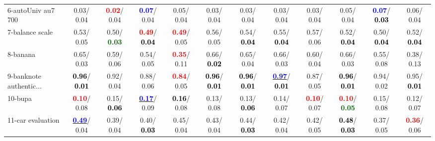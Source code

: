 \begin{table}[h]
\begin{center}
{\begin{tabular}{lc|c|c|c|c|c|c|c|c|c|c}
6-autoUniv au7 700 &   0.03/  0.04 & \textcolor{red}{\textbf{  0.02}}/  0.04 & \textcolor{blue}{\textbf{  0.07}}/  0.04 &   0.05/  0.04 &   0.03/  0.04 &   0.03/  0.04 &   0.03/  0.04 &   0.03/  0.04 &   0.05/  0.04 & \textcolor{blue}{\textbf{  0.07}}/\textcolor{black}{\textbf{  0.03}} &   0.06/  0.04 \\
7-balance scale &   0.53/  0.05 &   0.50/\textcolor{darkgreen}{\textbf{  0.03}} & \textcolor{red}{\textbf{  0.49}}/\textcolor{black}{\textbf{  0.04}} & \textcolor{red}{\textbf{  0.49}}/  0.05 &   0.56/  0.05 &   0.54/\textcolor{black}{\textbf{  0.04}} &   0.55/\textcolor{black}{\textbf{  0.04}} &   0.57/  0.06 &   0.52/\textcolor{black}{\textbf{  0.04}} &   0.50/\textcolor{black}{\textbf{  0.04}} &   0.52/\textcolor{black}{\textbf{  0.04}} \\ \hline
8-banana &   0.65/  0.03 &   0.59/  0.06 &   0.54/  0.05 & \textcolor{red}{\textbf{  0.35}}/  0.11 &   0.66/\textcolor{black}{\textbf{  0.02}} &   0.65/  0.04 &   0.66/  0.03 &   0.60/  0.04 &   0.66/  0.03 &   0.55/  0.08 &   0.38/  0.13 \\
9-banknote authentic... & \textcolor{black}{\textbf{  0.96}}/\textcolor{black}{\textbf{  0.01}} &   0.92/  0.04 &   0.88/  0.06 & \textcolor{red}{\textbf{  0.84}}/  0.05 & \textcolor{black}{\textbf{  0.96}}/\textcolor{black}{\textbf{  0.01}} & \textcolor{black}{\textbf{  0.96}}/\textcolor{black}{\textbf{  0.01}} & \underline{\textcolor{blue}{\textbf{  0.97}}}/\textcolor{black}{\textbf{  0.01}} &   0.87/  0.05 & \textcolor{black}{\textbf{  0.96}}/\textcolor{black}{\textbf{  0.01}} &   0.94/  0.02 &   0.95/\textcolor{black}{\textbf{  0.01}} \\
10-bupa & \textcolor{red}{\textbf{  0.10}}/  0.08 &   0.15/\textcolor{black}{\textbf{  0.06}} & \underline{\textcolor{blue}{\textbf{  0.17}}}/  0.09 & \textcolor{black}{\textbf{  0.16}}/  0.08 &   0.13/  0.08 &   0.13/\textcolor{black}{\textbf{  0.06}} &   0.14/  0.07 & \textcolor{red}{\textbf{  0.10}}/  0.07 & \textcolor{red}{\textbf{  0.10}}/\textcolor{darkgreen}{\textbf{  0.05}} &   0.15/  0.08 &   0.12/  0.07 \\
11-car evaluation & \underline{\textcolor{blue}{\textbf{  0.49}}}/  0.04 &   0.39/  0.04 &   0.40/\textcolor{black}{\textbf{  0.03}} &   0.45/  0.04 &   0.43/  0.04 &   0.44/\textcolor{black}{\textbf{  0.03}} &   0.42/  0.04 &   0.42/  0.05 & \textcolor{black}{\textbf{  0.48}}/\textcolor{black}{\textbf{  0.03}} &   0.37/  0.05 & \textcolor{red}{\textbf{  0.36}}/  0.06 \\

\end{tabular}}
\end{center}
\end{table}
